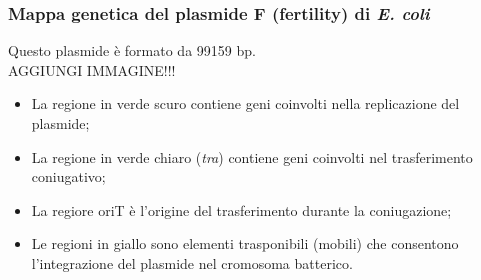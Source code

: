 \subsubsection{Mappa genetica del plasmide F (fertility) di \textit{E. coli}}
Questo plasmide è formato da 99159 bp.
\\AGGIUNGI IMMAGINE!!!
\begin{itemize}
    \item La regione in verde scuro contiene geni coinvolti nella replicazione del plasmide;
    \item La regione in verde chiaro (\textit{tra}) contiene geni coinvolti nel trasferimento coniugativo; 
    \item La regiore oriT è l'origine del trasferimento durante la coniugazione; 
    \item Le regioni in giallo sono elementi trasponibili (mobili) che consentono l'integrazione del plasmide nel cromosoma batterico. 
\end{itemize}
